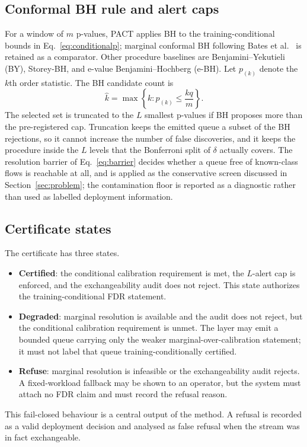 \documentclass[a4paper,fleqn]{cas-dc}
\newcommand{\PACT}{PACT\xspace}
\begin{document}
\subsection{Conformal BH rule and alert caps}
For a window of $m$ p-values, \PACT applies BH to the training-conditional bounds in Eq.~\eqref{eq:conditionalp}; marginal conformal BH following Bates et al.\ \cite{bates2023outliers} is retained as a comparator. Other procedure baselines are Benjamini--Yekutieli (BY), Storey-BH, and e-value Benjamini--Hochberg (e-BH). Let $p_{(k)}$ denote the $k$th order statistic. The BH candidate count is
\begin{equation}
 \widehat{k}=\max\left\{k:p_{(k)}\leq \frac{kq}{m}\right\}.
\end{equation}
The selected set is truncated to the $L$ smallest p-values if BH proposes more than the pre-registered cap. Truncation keeps the emitted queue a subset of the BH rejections, so it cannot increase the number of false discoveries, and it keeps the procedure inside the $L$ levels that the Bonferroni split of $\delta$ actually covers. The resolution barrier of Eq.~\eqref{eq:barrier} decides whether a queue free of known-class flows is reachable at all, and is applied as the conservative screen discussed in Section~\ref{sec:problem}; the contamination floor is reported as a diagnostic rather than used as labelled deployment information.

\subsection{Certificate states}
The certificate has three states.
\begin{itemize}
  \item \textbf{Certified}: the conditional calibration requirement is met, the $L$-alert cap is enforced, and the exchangeability audit does not reject. This state authorizes the training-conditional FDR statement.
  \item \textbf{Degraded}: marginal resolution is available and the audit does not reject, but the conditional calibration requirement is unmet. The layer may emit a bounded queue carrying only the weaker marginal-over-calibration statement; it must not label that queue training-conditionally certified.
  \item \textbf{Refuse}: marginal resolution is infeasible or the exchangeability audit rejects. A fixed-workload fallback may be shown to an operator, but the system must attach no FDR claim and must record the refusal reason.
\end{itemize}
This fail-closed behaviour is a central output of the method. A refusal is recorded as a valid deployment decision and analysed as false refusal when the stream was in fact exchangeable.
\end{document}
